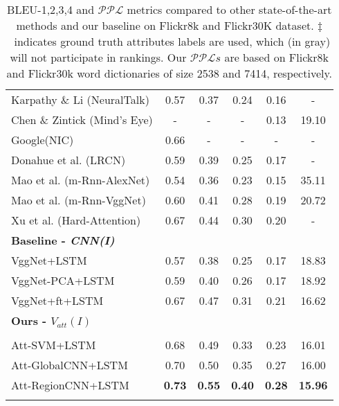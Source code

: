 \documentclass[10pt,journal,compsoc]{IEEEtran}
\def\Att{{V_{att}}}
\begin{document}
\begin{table}[t]
\begin{center}
{\begin{tabular}{l c c c c|c }
    Karpathy \& Li (NeuralTalk) \cite{Karpathy2014deepvs}& 0.57 & 0.37 & 0.24 & 0.16 & - \\
    Chen \& Zintick (Mind's Eye) \cite{Chen2015CVPRMind}& -&-&-&0.13&19.10 \\
    Google(NIC) \cite{vinyals2014show}& 0.66 & - & - &-&- \\
    Donahue et al. (LRCN) \cite{donahue2014long}&0.59&0.39&0.25&0.17&- \\
    Mao et al. (m-Rnn-AlexNet) \cite{mao2014deep}&0.54&0.36&0.23&0.15&35.11 \\
    Mao et al. (m-Rnn-VggNet) \cite{mao2014deep}&0.60&0.41&0.28&0.19&20.72 \\
    Xu et al. (Hard-Attention) \cite{xu2015show}&0.67&0.44&0.30&0.20&- \\
    \Xhline{2\arrayrulewidth}
    \textbf{Baseline - \textit{CNN(I)}} & & & & & \\ \hline
    VggNet+LSTM & 0.57 & 0.38 & 0.25 & 0.17 & 18.83 \\
    VggNet-PCA+LSTM & 0.59 & 0.40 & 0.26 & 0.17 & 18.92 \\
VggNet+ft+LSTM & 0.67 & 0.47 & 0.31 & 0.21 & 16.62 \\\Xhline{2\arrayrulewidth}
    \textbf{Ours - $\Att(I)$} & & & & & \\ \hline
\cellcolor[rgb]{0.7,0.7,0.7}{Att-GT+LSTM\textsuperscript{$\ddagger$}} & \cellcolor[rgb]{0.7,0.7,0.7}{0.78} & \cellcolor[rgb]{0.7,0.7,0.7}{0.57} & \cellcolor[rgb]{0.7,0.7,0.7}{0.42} & \cellcolor[rgb]{0.7,0.7,0.7}{0.30} & \cellcolor[rgb]{0.7,0.7,0.7}{14.88} \\
Att-SVM+LSTM & 0.68 & 0.49 & 0.33 &0.23 & 16.01 \\
    Att-GlobalCNN+LSTM&0.70&0.50&0.35&0.27&16.00\\
    Att-RegionCNN+LSTM & \textbf{0.73} & \textbf{0.55} & \textbf{0.40} & \textbf{0.28} & \textbf{15.96}\\
    \Xhline{2\arrayrulewidth}
  \end{tabular}}
\end{center}
  \vspace{-5pt}
 \caption{BLEU-1,2,3,4 and $\mathcal{PPL}$ metrics compared to other state-of-the-art methods and our baseline on Flickr8k and Flickr30K dataset. $\ddagger$~indicates ground truth attributes labels are used, which (in \colorbox[rgb]{0.7,0.7,0.7}{gray}) will not participate in rankings. Our $\mathcal{PPL}s$ are based on Flickr8k and Flickr30k word dictionaries of size 2538 and 7414, respectively.}
 \vspace{-10pt}
\label{tab1} 
\end{table}
\end{document}
